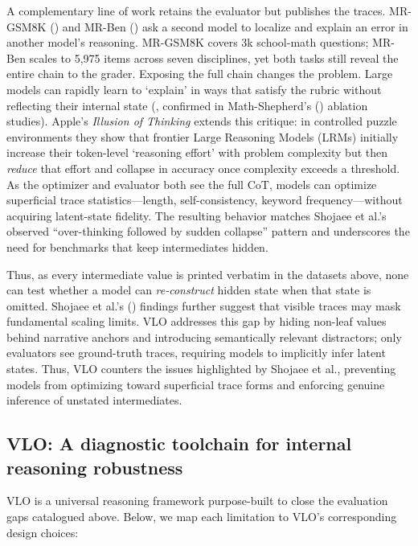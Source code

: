 \documentclass{article}
\begin{document}
A complementary line of work retains the evaluator but publishes the traces. MR-GSM8K (\citeyear{GSM8k}) and MR-Ben (\citeyear{MRBen}) ask a second model to localize and explain an error in another model’s reasoning. MR-GSM8K covers 3k school-math questions; MR-Ben scales to 5,975 items across seven disciplines, yet both tasks still reveal the entire chain to the grader. Exposing the full chain changes the problem.  Large models can rapidly learn to `explain' in ways that satisfy the rubric without reflecting their internal state (\cite{ye2022TheUnreliability}, confirmed in Math-Shepherd’s (\citeyear{mathshepherd}) ablation studies). Apple's \emph{Illusion of Thinking} \citep{IllusionOfThinking} extends this critique: in controlled puzzle environments they show that frontier Large Reasoning Models (LRMs) initially increase their token-level `reasoning effort' with problem complexity but then \textit{reduce} that effort and collapse in accuracy once complexity exceeds a threshold. As the optimizer and evaluator both see the full CoT, models can optimize superficial trace statistics—length, self-consistency, keyword frequency—without acquiring latent-state fidelity.  The resulting behavior matches Shojaee et al.’s observed ``over-thinking followed by sudden collapse'' pattern and underscores the need for benchmarks that keep intermediates hidden.

Thus, as every intermediate value is printed verbatim in the datasets above, none can test whether a model can \emph{re-construct} hidden state when that state is omitted. Shojaee et al.’s (\citeyear{IllusionOfThinking}) findings further suggest that visible traces may mask fundamental scaling limits. VLO addresses this gap by hiding non-leaf values behind narrative anchors and introducing semantically relevant distractors; only evaluators see ground-truth traces, requiring models to implicitly infer latent states. Thus, VLO counters the issues highlighted by Shojaee et al., preventing models from optimizing toward superficial trace forms and enforcing genuine inference of unstated intermediates.

\subsection{VLO: A diagnostic toolchain for internal reasoning robustness}
\label{subsec:vlo-diagnostic}
VLO is a universal reasoning framework purpose-built to close the evaluation gaps catalogued above. Below, we map each limitation to VLO's corresponding design choices:
\end{document}
